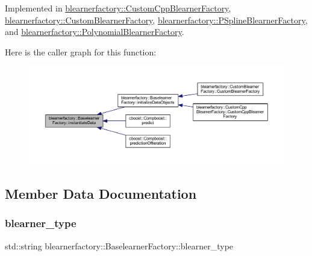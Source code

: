 Implemented in \mbox{\hyperlink{classblearnerfactory_1_1_custom_cpp_blearner_factory_abc9c251017197087af3ef8a1c0421969}{blearnerfactory\+::\+Custom\+Cpp\+Blearner\+Factory}}, \mbox{\hyperlink{classblearnerfactory_1_1_custom_blearner_factory_aac818f8969820d37ec1a391abbb996da}{blearnerfactory\+::\+Custom\+Blearner\+Factory}}, \mbox{\hyperlink{classblearnerfactory_1_1_p_spline_blearner_factory_a290a1c60224d027059939a895b474aa1}{blearnerfactory\+::\+P\+Spline\+Blearner\+Factory}}, and \mbox{\hyperlink{classblearnerfactory_1_1_polynomial_blearner_factory_aeea9c480671ae7cf7d3be470ce0feaef}{blearnerfactory\+::\+Polynomial\+Blearner\+Factory}}.

Here is the caller graph for this function\+:\nopagebreak
\begin{figure}[H]
\begin{center}
\leavevmode
\includegraphics[width=350pt]{classblearnerfactory_1_1_baselearner_factory_ac4a38c4815fb33b8d4785745117c5e57_icgraph}
\end{center}
\end{figure}


\subsection{Member Data Documentation}
\mbox{\label{classblearnerfactory_1_1_baselearner_factory_a3382b7d9833484f63755a26447a5d2e4}} 
\subsubsection{\texorpdfstring{blearner\+\_\+type}{blearner\_type}}
{\footnotesize\ttfamily std\+::string blearnerfactory\+::\+Baselearner\+Factory\+::blearner\+\_\+type\hspace{0.3cm}{\ttfamily [protected]}}

